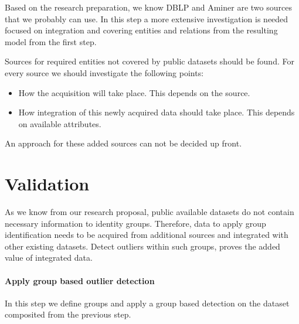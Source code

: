 \documentclass{ou-report}
\newcommand{\dblp}{DBLP}
\begin{document}
Based on the research preparation, we know \dblp{} and Aminer are two sources
that we probably can use. In this step a more extensive investigation is 
needed focused on integration and covering entities and relations from the 
resulting model from the first step.

Sources for required entities not covered by public datasets should be found. 
For every source we should investigate the following points:

\begin{itemize}
    \item How the acquisition will take place. This depends on the source.
    \item How integration of this newly acquired data should take place. This 
        depends on available attributes.
\end{itemize}

An approach for these added sources can not be decided up front.


\section{Validation}
As we know from our research 
proposal, public available datasets do not contain necessary information to 
identity groups. Therefore, data to apply group identification needs to be 
acquired from additional sources and integrated with other existing datasets. 
Detect outliers within such groups, proves the added value of integrated data.

\paragraph{Apply group based outlier detection}
In this step we define groups and apply a group based detection on the dataset
composited from the previous step.


\end{document}
